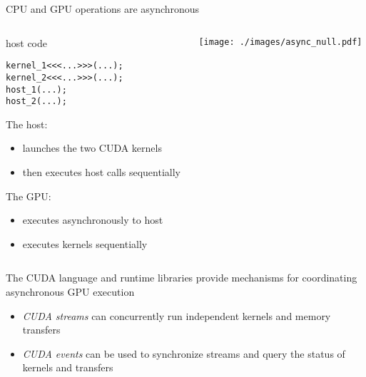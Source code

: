 \begin{frame}[fragile]{CPU and GPU operations are asynchronous}
    \begin{columns}[T]
        \begin{column}{0.5\textwidth}
            \begin{codecolumn}{host code}
                \begin{lstlisting}[style=boxcudatiny]
kernel_1<<<...>>>(...);
kernel_2<<<...>>>(...);
host_1(...);
host_2(...);
                \end{lstlisting}
            \end{codecolumn}
        The host:
        \begin{itemize}
            \item launches the two CUDA kernels
            \item then executes host calls sequentially 
        \end{itemize}
        The GPU:
        \begin{itemize}
            \item executes asynchronously to host
            \item executes kernels sequentially
        \end{itemize}
        \end{column}
        \begin{column}{0.5\textwidth}
            \texttt{[image: ./images/async\_null.pdf]}
        \end{column}
    \end{columns}
\end{frame}

\begin{frame}[fragile]{}
    The CUDA language and runtime libraries provide mechanisms for coordinating asynchronous GPU execution

    \begin{itemize}
        \item \emph{CUDA streams} can concurrently run independent kernels and memory transfers
        \item \emph{CUDA events} can be used to synchronize streams and query the status of kernels and transfers
    \end{itemize}

\end{frame}

